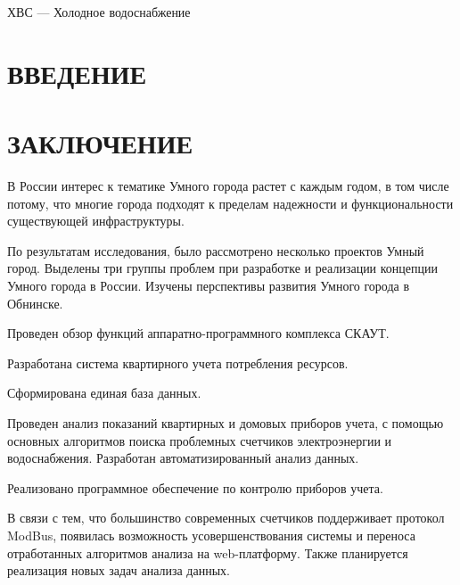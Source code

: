 \documentclass[a4paper,12pt]{article}
\begin{document}
ХВС --- Холодное водоснабжение



\pagebreak



\tableofcontents

\pagebreak

\section*{\centering ВВЕДЕНИЕ}
\pagebreak

%
\pagebreak
\pagebreak
\pagebreak
\pagebreak
\pagebreak
\pagebreak

\section*{\centering ЗАКЛЮЧЕНИЕ}

В России интерес к тематике Умного города растет с каждым годом, в том числе потому, что многие города подходят к пределам надежности и функциональности существующей инфраструктуры.

По результатам исследования, было рассмотрено несколько проектов Умный город. Выделены три группы проблем при разработке и реализации концепции Умного города в России. Изучены перспективы развития Умного города в Обнинске.

Проведен обзор функций аппаратно-программного комплекса СКАУТ.

Разработана система квартирного учета потребления ресурсов. 

Сформирована единая база данных. 

Проведен анализ показаний квартирных и домовых приборов учета, с помощью основных алгоритмов поиска проблемных счетчиков электроэнергии и водоснабжения. Разработан автоматизированный анализ данных.

Реализовано программное обеспечение по контролю приборов учета.

В связи с тем, что большинство современных счетчиков поддерживает протокол ModBus, появилась возможность усовершенствования системы и переноса отработанных алгоритмов анализа на web-платформу. Также планируется реализация новых задач анализа данных.
\end{document}

